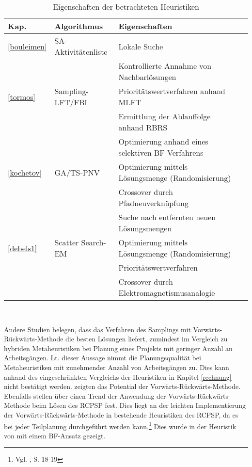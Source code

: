\documentclass[a4paper,12pt,normalheadings,footexclude,headinclude,liststotoc,nochapterprefix,onecolumn,oneside,parskip,pointlessnumbers]{scrreprt}
\begin{document}
\begin{table}[h!]
  \begin{center}
    \caption{Eigenschaften der betrachteten Heuristiken}  
    \begin{small} 
    \label{TabelleA}
    \vspace*{3mm}
    \begin{tabular}{llll}   %
    Kap. & Algorithmus							& Eigenschaften \\ \hline
\ref{bouleimen}&			SA-Aktivitätenliste    &Lokale Suche    \\
&&  Kontrollierte Annahme von Nachbarlösungen\\ \hline
\ref{tormos}&		Sampling-LFT/FBI                    &   Prioritätswertverfahren anhand MLFT\\
&&Ermittlung der Ablauffolge anhand RBRS   	   \\
&&Optimierung anhand eines selektiven BF-Verfahrens\\ \hline
\ref{kochetov}&	GA/TS-PNV                & Optimierung mittels Lösungsmenge (Randomisierung)  \\      
&&Crossover durch Pfadneuverknüpfung\\  	
&&Suche nach entfernten neuen Lösungsmengen\\ \hline
\ref{debels1}&		Scatter Search-EM                 & Optimierung mittels Lösungsmenge (Randomisierung)         	    \\
&&Prioritätswertverfahren\\
&&Crossover durch Elektromagnetismusanalogie\\
    \end{tabular} \\[3mm]
  \end{small} 
  \end{center}
\end{table}

Andere Studien belegen, dass das Verfahren des Samplings mit Vorwärts-Rückwärts-Methode die besten Lösungen liefert, zumindest im Vergleich zu hybriden Metaheuristiken bei Planung eines Projekts mit geringer Anzahl an Arbeitsgängen. Lt. dieser Aussage nimmt die Planungsqualität bei Metaheuristiken mit zunehmender Anzahl von Arbeitsgängen zu. Dies kann anhand des eingeschränkten Vergleichs der Heuristiken in Kapitel \ref{rechnung} nicht bestätigt werden. \cite{valls2005justification} zeigten das Potential der Vorwärts-Rückwärts-Methode. Ebenfalls stellen \cite{kolisch2006experimental} über einen Trend der Anwendung der Vor\-wärts-Rückwärts-Methode beim Lösen des RCPSP fest. Dies liegt an der leichten Implementierung der Vorwärts-Rückwärts-Methode in bestehende Heuristiken des RCPSP, da es bei jeder Teilplanung durchgeführt werden kann.\footnote{Vgl. \cite{valls2004population}, S. 18-19} Dies wurde in der Heuristik von \cite{tormos2003efficient} mit einem BF-Ansatz gezeigt.
\end{document}
